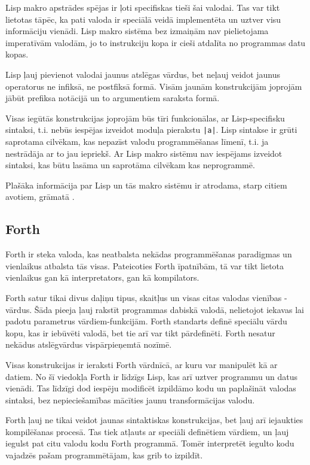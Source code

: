 Lisp makro apstrādes spējas ir ļoti specifiskas tieši šai valodai. Tas var tikt lietotas tāpēc, ka pati valoda ir speciālā veidā implementēta un uztver visu informāciju vienādi. Lisp makro sistēma bez izmaiņām nav pielietojama imperatīvām valodām, jo to instrukciju kopa ir cieši atdalīta no programmas datu kopas.

Lisp ļauj pievienot valodai jaunus atslēgas vārdus, bet neļauj veidot jaunus operatorus ne infiksā, ne postfiksā formā. Visām jaunām konstrukcijām joprojām jābūt prefiksa notācijā un to argumentiem saraksta formā.

Visas iegūtās konstrukcijas joprojām būs tīri funkcionālas, ar Lisp-specifisku sintaksi, t.i. nebūs iespējas izveidot moduļa pierakstu \verb/|a|/. Lisp sintakse ir grūti saprotama cilvēkam, kas nepazīst valodu programmēšanas līmenī, t.i. ja nestrādāja ar to jau iepriekš. Ar Lisp makro sistēmu nav iespējams izveidot sintaksi, kas būtu lasāma un saprotāma cilvēkam kas neprogrammē.

Plašāka informācija par Lisp un tās makro sistēmu ir atrodama, starp citiem avotiem, grāmatā \cite{Seibel:PracticalCommonLisp}.

\subsection{\label{sbs:rel_forth}Forth}

Forth ir steka valoda, kas neatbalsta nekādas programmēšanas paradigmas un vienlaikus atbalsta tās visas. Pateicoties Forth īpatnībām, tā var tikt lietota vienlaikus gan kā interpretators, gan kā kompilators.

Forth satur tikai divus daļiņu tipus, skaitļus un visas citas valodas vienības - vārdus. Šāda pieeja ļauj rakstīt programmas dabiskā valodā, nelietojot iekavas lai padotu parametrus vārdiem-funkcijām. Forth standarts definē speciālu vārdu kopu, kas ir iebūvēti valodā, bet tie arī var tikt pārdefinēti. Forth nesatur nekādus atslēgvārdus vispārpieņemtā nozīmē.

Visas konstrukcijas ir ieraksti Forth vārdnīcā, ar kuru var manipulēt kā ar datiem. No šī viedokļa Forth ir līdzīgs Lisp, kas arī uztver programmu un datus vienādi. Tas līdzīgi dod iespēju modificēt izpildāmo kodu un paplašināt valodas sintaksi, bez nepieciešamības mācīties jaunu transformācijas valodu.

Forth ļauj ne tikai veidot jaunas sintaktiskas konstrukcijas, bet ļauj arī iejaukties kompilēšanas procesā. Tas tiek atļauts ar speciāli definētiem vārdiem, un ļauj iegulst pat citu valodu kodu Forth programmā. Tomēr interpretēt iegulto kodu vajadzēs pašam programmētājam, kas grib to izpildīt.

